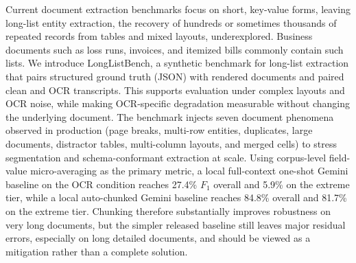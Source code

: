 Current document extraction benchmarks focus on short, key-value forms, leaving long-list entity extraction, the recovery of hundreds or sometimes thousands of repeated records from tables and mixed layouts, underexplored. Business documents such as loss runs, invoices, and itemized bills commonly contain such lists. We introduce LongListBench, a synthetic benchmark for long-list extraction that pairs structured ground truth (JSON) with rendered documents and paired clean and OCR transcripts. This supports evaluation under complex layouts and OCR noise, while making OCR-specific degradation measurable without changing the underlying document.
The benchmark injects seven document phenomena observed in production (page breaks, multi-row entities, duplicates, large documents, distractor tables, multi-column layouts, and merged cells) to stress segmentation and schema-conformant extraction at scale. Using corpus-level field-value micro-averaging as the primary metric, a local full-context one-shot Gemini baseline on the OCR condition reaches 27.4\% $F_1$ overall and 5.9\% on the extreme tier, while a local auto-chunked Gemini baseline reaches 84.8\% overall and 81.7\% on the extreme tier. Chunking therefore substantially improves robustness on very long documents, but the simpler released baseline still leaves major residual errors, especially on long detailed documents, and should be viewed as a mitigation rather than a complete solution.
%
